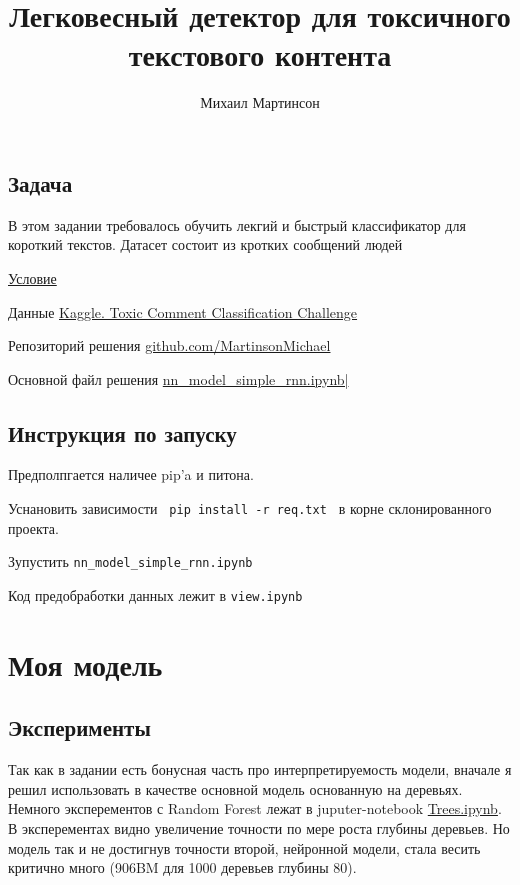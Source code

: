 \documentclass[13pt,a4paper]{article}
\title{Легковесный детектор для токсичного текстового контента}
\author{Михаил Мартинсон}
\theoremstyle{remark}
\begin{document}
	\maketitle
	
	\label{firstpage}
	
	\subsection*{Задача}
	
	В этом задании требовалось обучить лекгий и быстрый классификатор для короткий текстов. Датасет состоит из кротких сообщений людей
	
	
	\href{https://github.com/MartinsonMichael/VK_Lab_intro/blob/master/%D0%9F%D1%80%D0%B8%D0%BA%D0%BB%D0%B0%D0%B4%D0%BD%D1%8B%D0%B5%20%D0%B8%D1%81%D1%81%D0%BB%D0%B5%D0%B4%D0%BE%D0%B2%D0%B0%D0%BD%D0%B8%D1%8F%20.pdf}{Условие}
		
	Данные \href{https://www.kaggle.com/c/jigsaw-toxic-comment-classification-challenge/overview}{Kaggle. Toxic Comment Classification Challenge}
	
	Репозиторий решения \href{https://github.com/MartinsonMichael/VK_Lab_intro}{github.com/MartinsonMichael}
		
	Основной файл решения \href{https://github.com/MartinsonMichael/VK_Lab_intro/blob/master/nn_model_simple_rnn.ipynb}{nn\_model\_simple\_rnn.ipynb|}

	\subsection*{Инструкция по запуску}
	
	Предполпгается наличее pip'a и питона. 
	
	Уснановить зависимости \verb| pip install -r req.txt | в корне склонированного проекта.
	
	Зупустить \verb|nn_model_simple_rnn.ipynb| 
	
	Код предобработки данных лежит в \verb|view.ipynb|
	
	
	\section{Моя модель}
	
	\subsection*{Эксперименты}
	
	Так как в задании есть бонусная часть про интерпретируемость модели, вначале я решил использовать в качестве основной модель основанную на деревьях. Немного эксперементов с Random Forest лежат в juputer-notebook
	\href{https://github.com/MartinsonMichael/VK_Lab_intro/blob/master/Trees.ipynb}{Trees.ipynb}. В эксперементах видно увеличение точности по мере роста глубины деревьев. Но модель так и не достигнув точности второй, нейронной модели, стала весить критично много (906BM для 1000 деревьев глубины 80).
	
\end{document}
